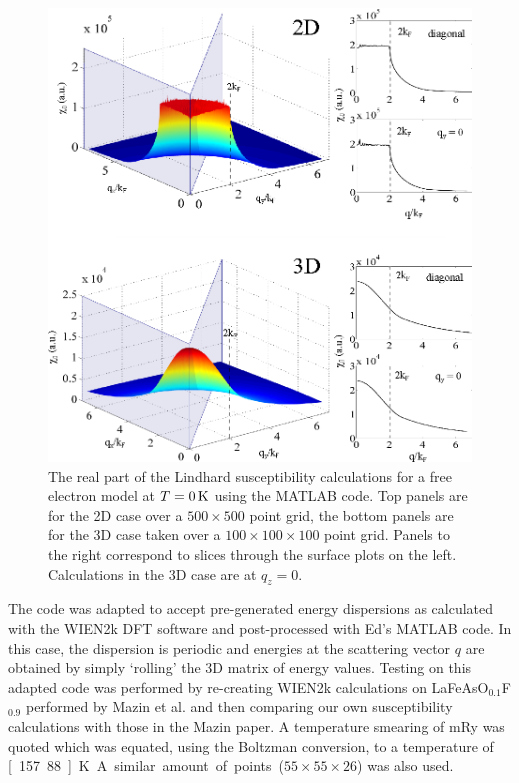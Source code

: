 \begin{figure}[htbp]
    \begin{center}
        \includegraphics[scale=0.9]{Chapter-dHvABaFe2P2/Figures/AngleDepMeasurements/SusceptibilityFreeElectron/SusceptibilityFreeElectron}
        \caption{The real part of the Lindhard susceptibility calculations for a free electron model at $T=\unit[0]{K}$ using the MATLAB  code. Top panels are for the 2D case over a $500\times500$ point grid, the bottom panels are for the 3D case taken over a $100\times100\times100$ point grid. Panels to the right correspond to slices through the surface plots on the left. Calculations in the 3D case are at $q_z=0$.}
        \label{Fig:Exp:FreeElectronSusceptibility}
    \end{center}
\end{figure}


The code was adapted to accept pre-generated energy dispersions as calculated with the WIEN2k DFT software and post-processed with Ed's MATLAB code. In this case, the dispersion is periodic and energies at the scattering vector $q$ are obtained by simply `rolling' the 3D matrix of energy values. Testing on this adapted code was performed by re-creating WIEN2k calculations on LaFeAsO$_{0.1}$F$_{0.9}$ performed by Mazin et al.\cite{Mazin2008} and then comparing our own susceptibility calculations with those in the Mazin paper. A temperature smearing of \unit[1]{mRy} was quoted which was equated, using the Boltzman conversion, to a temperature of \unit[157.88]{K}. A similar amount of points ($55\times55\times26$) was also used.

